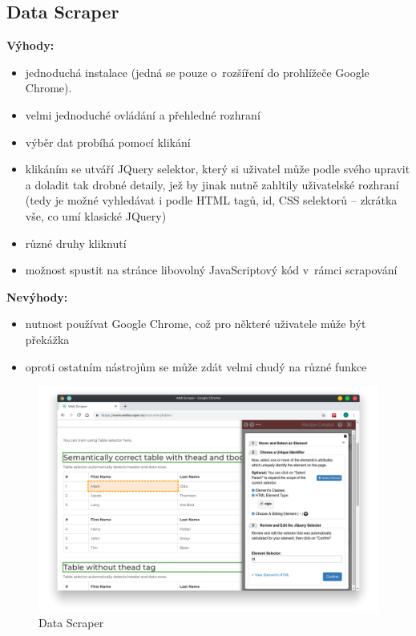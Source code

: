 \documentclass[thesis=B,czech]{FITthesis2}[2012/06/26]
\begin{document}
	
	\subsection{Data Scraper}
	\textbf{Výhody:}
	\begin{itemize}
		\item jednoduchá instalace (jedná se pouze o~rozšíření do prohlížeče Google Chrome).
		\item velmi jednoduché ovládání a přehledné rozhraní
		\item výběr dat probíhá pomocí klikání
		\item klikáním se utváří JQuery selektor, který si uživatel může podle svého upravit a doladit tak drobné detaily, jež by jinak nutně zahltily uživatelské rozhraní (tedy je možné vyhledávat i podle HTML tagů, id, CSS selektorů -- zkrátka vše, co umí klasické JQuery)
		\item různé druhy kliknutí
		\item možnost spustit na stránce libovolný JavaScriptový kód v~rámci scrapování
	\end{itemize}
	\textbf{Nevýhody:}
	\begin{itemize}
		\item nutnost používat Google Chrome, což pro některé uživatele může být překážka
		\item oproti ostatním nástrojům se může zdát velmi chudý na různé funkce
	\end{itemize}
	\begin{figure}
		\includegraphics[width=\linewidth]{images/DataScraper.png}
		\caption{Data Scraper\cite[snímek pořídil autor]{data_scraper}}
		\label{fig:dataScraper}
	\end{figure}
\end{document}
